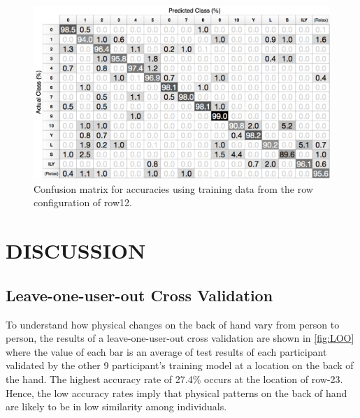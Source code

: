 \documentclass{sigchi}
\begin{document}
\begin{figure}
  \begin{center}
  \includegraphics[width=1\columnwidth]{figures/CM_v2.pdf}
  \caption{Confusion matrix for accuracies using training data from the row configuration of row12.}
  \label{fig:CM}
  \end{center}
\end{figure}

\section{DISCUSSION}

\subsection{Leave-one-user-out Cross Validation}
To understand how physical changes on the back of hand vary from person to person, the results of a leave-one-user-out cross validation are shown in \autoref{fig:LOO} where the value of each bar is an average of test results of each participant validated by the other 9 participant's training model at a location on the back of the hand. The highest accuracy rate of 27.4\% occurs at the location of row-23. Hence, the low accuracy rates imply that physical patterns on the back of hand are likely to be in low similarity among individuals.
\end{document}
